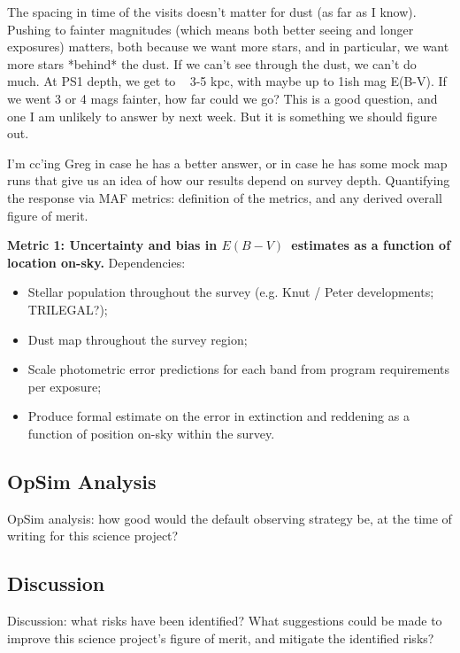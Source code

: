 The spacing in time of the visits doesn't matter for dust (as far as I know). 
Pushing to fainter magnitudes (which means both better seeing and longer exposures) matters, both because we want more stars, and in particular, we want more stars *behind* the dust.  If we can't see through the dust, we can't do much.  At PS1 depth, we get to ~ 3-5 kpc, with maybe up to 1ish mag E(B-V).  If we went 3 or 4 mags fainter, how far could we go?  This is a good question, and one I am unlikely to answer by next week.  But it is something we should figure out. 

I'm cc'ing Greg in case he has a better answer, or in case he has some mock map runs that give us an idea of how our results depend on survey depth. 
Quantifying the response via MAF metrics: definition of the metrics,
and any derived overall figure of merit.

{\bf Metric 1: Uncertainty and bias in $E(B-V)$~estimates as a
  function of location on-sky.} Dependencies:

\begin{itemize}
  \item Stellar population throughout the survey (e.g. Knut / Peter developments; TRILEGAL?);
    \item Dust map throughout the survey region;
    \item Scale photometric error predictions for each band from program requirements per exposure;
      \item Produce formal estimate on the error in extinction and reddening as a function of position on-sky within the survey.
\end{itemize}



\subsection{OpSim Analysis}
\label{sec:\secname:analysis}

OpSim analysis: how good would the default observing strategy be, at
the time of writing for this science project?



\subsection{Discussion}
\label{sec:\secname:discussion}

Discussion: what risks have been identified? What suggestions could be
made to improve this science project's figure of merit, and mitigate
the identified risks?



\navigationbar

